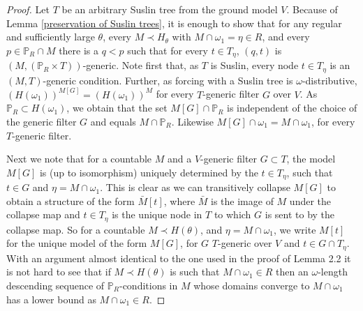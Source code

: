 \documentclass[10pt,a4paper]{amsart}
\newcommand{\forceP}{\mathbb{P}}
\begin{document}
\begin{proof}
Let $T$ be an arbitrary Suslin tree from the ground model $V$.
Because of Lemma \ref{preservation of Suslin trees}, it is enough to show that for any regular and sufficiently large
 $\theta$, every $M \prec H_{\theta}$ with $M \cap \omega_1 = \eta \in R$, and every
 $p \in \forceP_R \cap M$ there is a $q<p$ such that for every
 $t \in T_{\eta}$, $(q,t)$ is $(M,(\forceP_R \times T))$-generic.
 Note first that, as $T$ is Suslin, every node $t \in T_{\eta}$ is an
 $(M,T)$-generic condition. Further, as forcing with a Suslin tree
 is $\omega$-distributive, $(H(\omega_1))^{M[G]} = (H(\omega_1))^M$ for every $T$-generic filter $G$ over $V$. As $\forceP_R  \subset H(\omega_1)$, we obtain that the set $M[G] \cap \forceP_R$ is independent of the choice of the generic filter $G$ and equals $M \cap \forceP_R$. Likewise $M[G] \cap \omega_1= M \cap \omega_1$, for every $T$-generic filter.
 
 Next we note that for a countable $M$ and a $V$-generic filter $G \subset T$, 
 the model $M[G]$ is (up to isomorphism) uniquely determined by the $t \in T_{\eta}$, such that $t \in G$ and $\eta= M \cap \omega_1$. This is clear as we can transitively collapse $M[G]$ to obtain a structure of the form $\bar{M}[t]$, where $\bar{M}$ is the image of $M$ under the collapse map and $t \in T_{\eta}$ is the unique node in $T$ to which $G$ is sent to by the collapse map. 
So for a countable $M \prec H(\theta)$, and $\eta= M \cap \omega_1$, we write $M[t]$ for the unique model of the form $M[G]$, for $ G$ $T$-generic over $V$ and $t \in G \cap T_{\eta}$.
With an argument almost identical to the one used in the proof of Lemma 2.2 it is not hard to see that if $M\prec H(\theta)$ is such
 that $M \cap \omega_1 \in R$ then an $\omega$-length descending sequence
 of $\forceP_R$-conditions in $M$ whose domains converge to $M \cap \omega_1$
 has a lower bound as $M \cap \omega_1 \in R$.
 

\end{proof}
\end{document}
